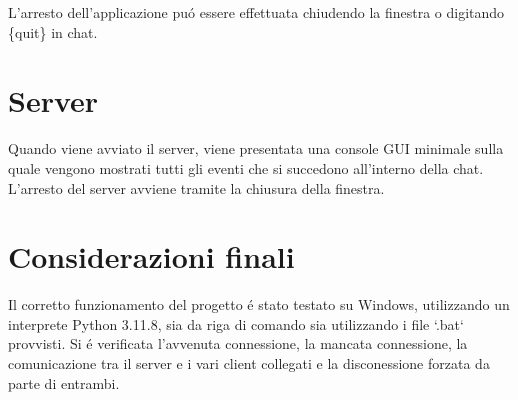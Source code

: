\documentclass{article}
\begin{document}
L'arresto dell'applicazione pu\'{o} essere effettuata chiudendo la finestra o digitando \{quit\} in chat.

\section*{Server}

Quando viene avviato il server, viene presentata una console GUI minimale sulla quale vengono mostrati tutti gli eventi che si succedono all'interno della chat.\\ 

L'arresto del server avviene tramite la chiusura della finestra.

\newpage

\section*{Considerazioni finali}

Il corretto funzionamento del progetto \'{e} stato testato su Windows, utilizzando un interprete Python 3.11.8, sia da riga di comando sia utilizzando i file `.bat` provvisti. 
Si \'{e} verificata l'avvenuta connessione, la mancata connessione, la comunicazione tra il server e i vari client collegati e la disconessione forzata da parte di entrambi.
\end{document}
